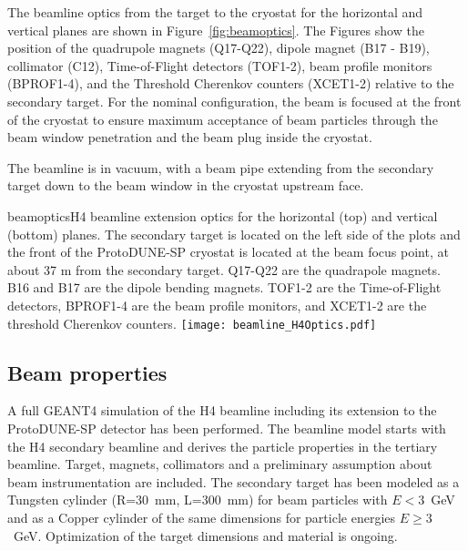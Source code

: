 The beamline optics from the target to the cryostat for the horizontal and vertical planes are shown in Figure~\ref{fig:beamoptics}. The Figures show the position of the quadrupole magnets (Q17-Q22), dipole magnet (B17 - B19), collimator (C12), Time-of-Flight detectors (TOF1-2), beam profile monitors (BPROF1-4), and the Threshold Cherenkov counters (XCET1-2)  relative to the secondary target.  For the nominal configuration, the beam is focused at the front of the cryostat to ensure maximum acceptance of beam particles through the beam window penetration and the beam plug inside the cryostat.

The beamline is in vacuum, with a beam pipe extending from the secondary target down to the beam window in the cryostat upstream face. 

\begin{cdrfigure}{beamoptics}{H4 beamline extension optics for the horizontal (top) and vertical (bottom) planes. The secondary target is located on the left side of the plots and the front of the ProtoDUNE-SP cryostat is located at the beam focus point, at about 37 m from the secondary target. Q17-Q22 are the quadrapole magnets. B16 and B17 are the dipole bending magnets. TOF1-2 are the Time-of-Flight detectors, BPROF1-4 are the beam profile monitors, and XCET1-2 are the threshold Cherenkov counters. }
 \texttt{[image: beamline\_H4Optics.pdf]}
\end{cdrfigure}

\subsection{Beam properties}
A full GEANT4 simulation of the H4 beamline including its extension to the ProtoDUNE-SP detector %
has been performed.%
 The beamline model starts with the H4 secondary beamline 
and derives the particle properties in the tertiary beamline.  Target, magnets, collimators and a preliminary assumption
about beam instrumentation are included. The secondary target has been
modeled as a Tungsten cylinder (R=30~mm, L=300~mm) for beam particles with $E<3$~GeV and as a Copper cylinder of the same dimensions  for %
particle energies  $E\geqslant3$~GeV. Optimization of the target dimensions and material is ongoing.

